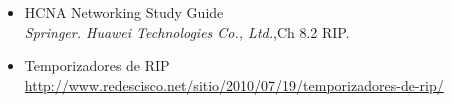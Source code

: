 \documentclass[letterpaper,12pt]{article}
\begin{document}
	\begin{itemize}
		\item{HCNA Networking Study Guide}  \\
		\textit{Springer. Huawei Technologies Co., Ltd.},Ch 8.2 RIP.
		\item{Temporizadores de RIP}  \\
		\url{http://www.redescisco.net/sitio/2010/07/19/temporizadores-de-rip/}
	\end{itemize}
\end{document}
